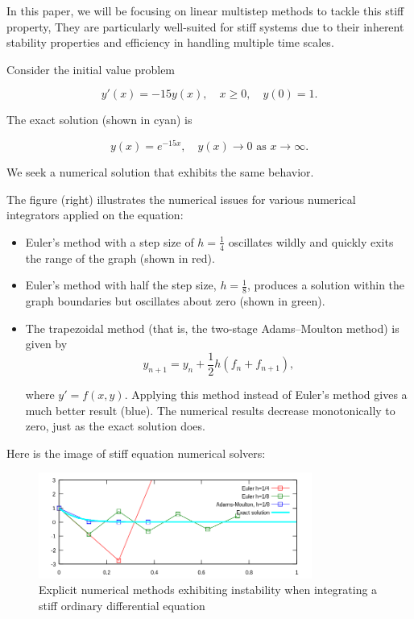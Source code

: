 In this paper, we will be focusing on linear multistep methods to tackle this stiff property,  They are particularly well-suited for stiff systems due to their inherent stability properties and efficiency in handling multiple time scales.





Consider the initial value problem

\[
y'(x) = -15y(x), \quad x \geq 0, \quad y(0) = 1. \tag{1}
\]

The exact solution (shown in cyan) is

\[
y(x) = e^{-15x}, \quad y(x) \rightarrow 0 \text{ as } x \rightarrow \infty. \tag{2}
\]

We seek a numerical solution that exhibits the same behavior.

The figure (right) illustrates the numerical issues for various numerical integrators applied on the equation:
\begin{itemize}
    \item Euler's method with a step size of $h = \frac{1}{4}$ oscillates wildly and quickly exits the range of the graph (shown in red).
    \item Euler's method with half the step size, $h = \frac{1}{8}$, produces a solution within the graph boundaries but oscillates about zero (shown in green).
    \item The trapezoidal method (that is, the two-stage Adams–Moulton method) is given by
    \begin{equation}
      y_{n+1} = y_{n} + \frac{1}{2}h \left( f_{n} + f_{n+1} \right),
    \end{equation}

    where $y' = f(x,y)$. Applying this method instead of Euler's method gives a much better result (blue). The numerical results decrease monotonically to zero, just as the exact solution does.
\end{itemize}

Here is the image of stiff equation numerical solvers:

\begin{figure}[htbp]
  \centering
  \includegraphics[width=0.8\textwidth]{chapters/2/StiffEquationNumericalSolvers.svg.png}
  \caption{Explicit numerical methods exhibiting instability when integrating a stiff ordinary differential equation}
  \label{fig:stiff_equation}
\end{figure}




